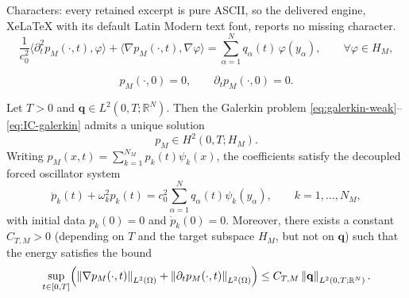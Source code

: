 \documentclass[10pt,a4paper]{amsart}
\newcommand{\norm}[1]{\left\lVert #1 \right\rVert}
\begin{document}
Characters: every retained excerpt is pure ASCII, so the delivered engine, XeLaTeX with its default Latin Modern text font, reports no missing character.
\begin{equation}
\label{eq:galerkin-weak}
 \frac{1}{c_0^2}\langle \partial_t^2 p_M(\cdot,t), \varphi\rangle
 + \langle \nabla p_M(\cdot,t), \nabla \varphi\rangle
 = \sum_{\alpha=1}^N q_\alpha(t)\,\varphi(y_\alpha),
 \qquad \forall \varphi\in H_M,
\end{equation}

\begin{equation}
\label{eq:IC-galerkin}
 p_M(\cdot,0)=0,\qquad \partial_t p_M(\cdot,0)=0.
\end{equation}

\begin{proposition}
\label{prop:well-posed}
Let $T>0$ and $\mathbf q\in L^2(0,T;\mathbb R^N)$. Then the Galerkin problem
\eqref{eq:galerkin-weak}--\eqref{eq:IC-galerkin} admits a unique solution
\[
 p_M\in H^2(0,T;H_M).
\]
Writing $p_M(x,t)=\sum_{k=1}^{N_M} p_k(t)\psi_k(x)$, the coefficients satisfy the decoupled forced oscillator system
\begin{equation}
\label{eq:mode-ODE-N}
 \ddot p_k(t)+\omega_k^2 p_k(t)
 = c_0^2 \sum_{\alpha=1}^N q_\alpha(t)\psi_k(y_\alpha),
 \qquad k=1,\dots,N_M,
\end{equation}
with initial data $p_k(0)=0$ and $\dot p_k(0)=0$.
Moreover, there exists a constant $C_{T,M}>0$ (depending on $T$ and the target subspace $H_M$, but not on $\mathbf{q}$) such that the energy satisfies the bound
\begin{equation}
\label{eq:galerkin-energy-est}
 \sup_{t\in[0,T]}
 \Bigl(
  \norm{\nabla p_M(\cdot,t)}_{L^2(\Omega)}
  + \norm{\partial_t p_M(\cdot,t)}_{L^2(\Omega)}
 \Bigr)
 \le C_{T,M} \norm{\mathbf q}_{L^2(0,T;\mathbb R^N)}.
\end{equation}
\end{proposition}
\end{document}
